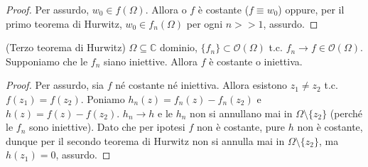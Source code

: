 \begin{proof}
  Per assurdo, $w_0 \in f(\Omega)$. Allora o $f$ è costante ($f \equiv w_0$) oppure, per il primo teorema di Hurwitz, $w_0 \in f_n(\Omega)$ per ogni $n>>1$, assurdo.
\end{proof}

\begin{cor}
  (Terzo teorema di Hurwitz) $\Omega \subseteq \mathbb{C}$ dominio, $\{f_n\} \subset \mathcal{O}(\Omega)$ t.c. $f_n \rightarrow f \in \mathcal{O}(\Omega)$. Supponiamo che le $f_n$ siano iniettive. Allora $f$ è costante o iniettiva.
\end{cor}

\begin{proof}
  Per assurdo, sia $f$ né costante né iniettiva. Allora esistono $z_1 \not=z_2$ t.c. $f(z_1)=f(z_2)$. Poniamo $h_n(z)=f_n(z)-f_n(z_2)$ e $h(z)=f(z)-f(z_2)$. $h_n \rightarrow h$ e le $h_n$ non si annullano mai in $\Omega \setminus \{z_2\}$ (perché le $f_n$ sono iniettive). Dato che per ipotesi $f$ non è costante, pure $h$ non è costante, dunque per il secondo teorema di Hurwitz non si annulla mai in $\Omega \setminus \{z_2\}$, ma $h(z_1)=0$, assurdo.
\end{proof}
